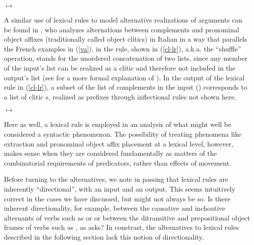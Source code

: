 \documentclass[output=paper
                ,modfonts
                ,nonflat
	        ,collection
	        ,collectionchapter
	        ,collectiontoclongg
 	        ,biblatex
                ,babelshorthands
                ,newtxmath
                ,draftmode
                ,colorlinks, citecolor=brown
]{./langsci/langscibook}
\begin{document}
{\begin{exe}
	\ex\label{celr}
	$\mapsto$
\end{exe}


A similar use of lexical rules to model alternative realizations of arguments can be found in ,  who analyzes alternations between complements and pronominal object affixes (traditionally called object clitics) in Italian in a way that parallels the French examples in (\ref{va}). \shuffle{} in the rule, shown in (\ref{cl-lr}), a.k.a. the ``shuffle'' operation, stands for the unordered concatenation of two lists, since any member of the input's  list can be realized as a clitic and therefore not included in the output's  list (see  for a more formal explanation of \shuffle). In the output of the lexical rule in (\ref{cl-lr}), a subset of the list of complements in the input () corresponds to a list of clitic s, realized as prefixes through inflectional rules not shown here. 

\begin{exe}
	\ex\label{cl-lr}
	$\mapsto$
\end{exe}

Here as well, a lexical rule is employed in an analysis of what might well be considered a syntactic phenomenon.
The possibility of treating phenomena like extraction and pronominal object affix placement at a lexical level, however, makes sense when they are considered fundamentally as matters of the combinatorial requirements of predicators, rather than effects of movement.

Before turning to the alternatives, we note in passing that lexical rules are inherently ``directional'', with an input and an output.
This seems intuitively correct in the cases we have discussed, but might not always be so.
Is there inherent directionality, for example, between the causative and inchoative alternants of verbs such as  or  or between the ditransitive and prepositional object frames of verbs such as , as \citet{Goldberg1995} asks?
In constrast, the alternatives to lexical rules described in the following section lack this notion of directionality.

}
\end{document}
